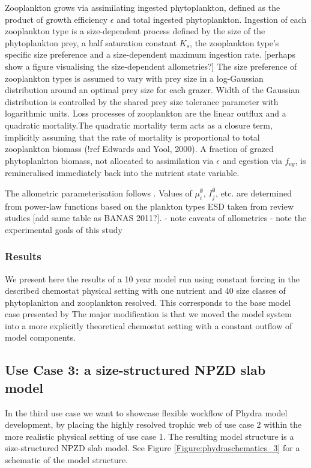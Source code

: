 \documentclass[journal abbreviations, manuscript]{copernicus}
\begin{document}
Zooplankton grows via assimilating ingested phytoplankton, defined as the product of growth efficiency $\epsilon$ and total ingested phytoplankton. Ingestion of each zooplankton type is a size-dependent process defined by the size of the phytoplankton prey, a half saturation constant $K_s$, the zooplankton type's specific size preference and a size-dependent maximum ingestion rate. [perhaps show a figure visualising the size-dependent allometries?]
The size preference of zooplankton types is assumed to vary with prey size in a log-Gaussian distribution around an optimal prey size for each grazer.
Width of the Gaussian distribution is controlled by the shared prey size tolerance parameter with logarithmic units.
Loss processes of zooplankton are the linear outflux and a quadratic mortality.The quadratic mortality term acts as a closure term, implicitly assuming that the rate of mortality is proportional to total zooplankton biomass (!ref Edwards and Yool, 2000). 
A fraction of grazed phytoplankton biomass, not allocated to assimilation via $\epsilon$ and egestion via $f_{eg}$, is remineralised immediately back into the nutrient state variable.

The allometric parameterisation follows \cite{Banas2011b}. Values of $\mu_i^\emptyset$, $I_j^\emptyset$, etc. are determined from power-law functions based on the plankton types ESD taken from review studies [add same table as BANAS 2011?].
- note caveats of allometries
- note the experimental goals of this study


\subsubsection{Results}

We present here the results of a 10 year model run using constant forcing in the described chemostat physical setting with one nutrient and 40 size classes of phytoplankton and zooplankton resolved. This corresponds to the base model case presented by \cite{Banas2011b} The major modification is that we moved the model system into a more explicitly theoretical chemostat setting with a constant outflow of model components. 


\subsection{Use Case 3: a size-structured NPZD slab model}
In the third use case we want to showcase flexible workflow of Phydra model development, by placing the highly resolved trophic web of use case 2 within the more realistic physical setting of use case 1. The resulting model structure is a size-structured NPZD slab model. See Figure \ref{Figure:phydraschematics_3} for a schematic of the model structure. 
\end{document}
